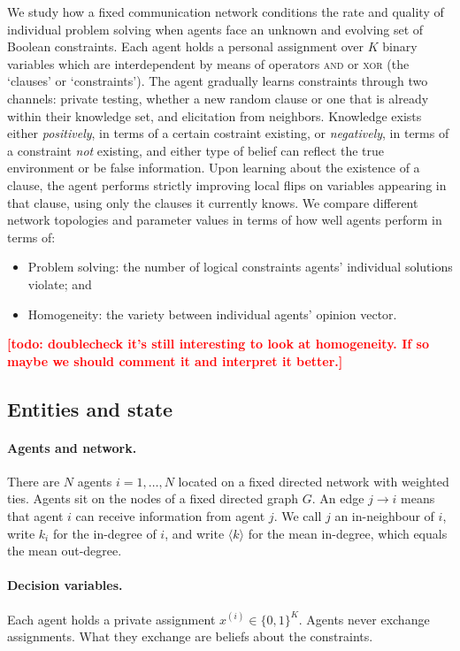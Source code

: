 \documentclass[11pt]{article}
\newcommand{\todo}[1]{\textcolor{red}{\textbf{[#1]}}}
\begin{document}
We study how a fixed communication network conditions the rate and quality of individual problem solving when
agents face an unknown and evolving set of Boolean constraints. Each agent holds a personal assignment over
$K$ binary variables which are interdependent by means of operators \textsc{and} or \textsc{xor} (the ‘clauses’ or ‘constraints’).
The agent gradually learns constraints through two channels: private testing, whether a new random clause or one that is already within their knowledge set, and elicitation from neighbors. Knowledge exists either \textit{positively}, in terms of a certain costraint existing, or \textit{negatively}, in terms of a constraint \textit{not} existing, and either type of belief can reflect the true environment or be false information. Upon learning about the existence of a clause, the agent performs strictly improving local flips on variables appearing in that clause,
using only the clauses it currently knows. We compare
different network topologies and parameter values in terms of how well agents perform in terms of:
\begin{itemize}
    \item Problem solving: the number of logical constraints agents' individual solutions violate; and
    \item Homogeneity: the variety between individual agents' opinion vector.
\end{itemize}
\todo{todo: doublecheck it's still interesting to look at homogeneity. If so maybe we should comment it and interpret it better.}

\subsection{Entities and state}

\paragraph{Agents and network.}
There are \(N\) agents \(i=1,\dots,N\) located on a fixed directed network with weighted ties. Agents sit on the nodes of a fixed directed graph $G$. An edge $j \to i$ means that agent $i$ can receive information from agent $j$. We call $j$ an in-neighbour of $i$, write $k_i$ for the in-degree of $i$, and write $\langle k\rangle$ for the mean in-degree, which equals the mean out-degree.

\paragraph{Decision variables.} Each agent holds a private assignment $x^{(i)} \in \{0,1\}^K$. Agents never exchange assignments. What they exchange are beliefs about the constraints.
\end{document}

